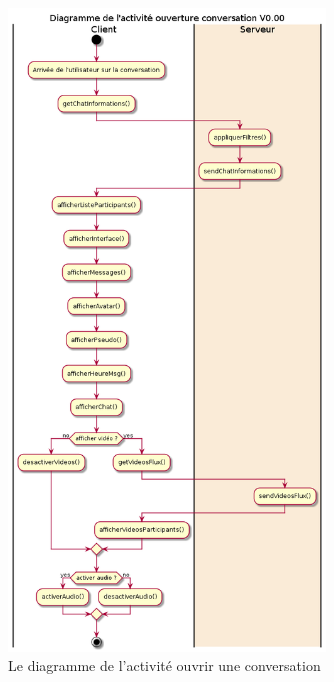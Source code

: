 \documentclass[11pt,dvipsnames,svgnames]{report}
\begin{document}
\begin{figure}[H]
\centerline{\includegraphics[width=0.75\textwidth]{diagrammes/activity-openConv-diag.png}}
\caption{Le diagramme de l'activité \og ouvrir une conversation \fg}
\end{figure}
\end{document}
